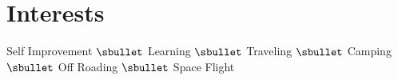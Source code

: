 \section{Interests}
\begin{center}
{ Self Improvement $\sbullet$ Learning $\sbullet$ Traveling $\sbullet$ Camping $\sbullet$ Off Roading $\sbullet$ Space Flight}
\end{center}